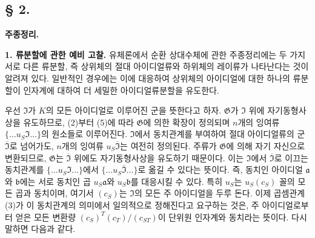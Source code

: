 
\subsection*{§ 2.}
\begin{center}
\textbf{주종정리.}
\end{center}

\noindent\textbf{1. 류분할에 관한 예비 고찰.} 유체론에서 순환 상대수체에 관한 주종정리에는 두 가지 서로 다른 류분할, 즉 상위체의 절대 아이디얼류와 하위체의 레이류가 나타난다는 것이 알려져 있다. 일반적인 경우에는 이에 대응하여 상위체의 아이디얼에 대한 하나의 류분할이 인자계에 대하여 더 세밀한 아이디얼류분할을 유도한다.

우선 \(\mathfrak I\)가 \(K\)의 모든 아이디얼로 이루어진 군을 뜻한다고 하자. \(\mathfrak G\)가 \(\mathfrak I\) 위에 자기동형사상을 유도하므로, (2)부터 (5)에 따라 \(\mathfrak G\)에 의한 확장이 정의되며 \(n\)개의 잉여류 \(\{\ldots u_S\mathfrak I\ldots\}\)의 원소들로 이루어진다. \(\mathfrak I\)에서 동치관계를 부여하여 절대 아이디얼류의 군 \(\overline{\mathfrak I}\)로 넘어가도, \(n\)개의 잉여류 \(u_S\overline{\mathfrak I}\)는 여전히 정의된다. 주류가 \(\mathfrak G\)에 의해 자기 자신으로 변환되므로, \(\mathfrak G\)는 \(\overline{\mathfrak I}\) 위에도 자기동형사상을 유도하기 때문이다. 이는 \(\mathfrak I\)에서 \(\overline{\mathfrak I}\)로 이끄는 동치관계를 \(\{\ldots u_S\mathfrak I\ldots\}\)에서 \(\{\ldots u_S\overline{\mathfrak I}\ldots\}\)로 옮길 수 있다는 뜻이다. 즉, 동치인 아이디얼 \(\mathfrak a\)와 \(\mathfrak b\)에는 서로 동치인 곱 \(u_S\mathfrak a\)와 \(u_S\mathfrak b\)를 대응시킬 수 있다. 특히 \(u_S\)는 \(u_S(c_S)\) 꼴의 모든 곱과 동치이며, 여기서 \((c_S)\)는 \(\mathfrak I\)의 모든 주 아이디얼을 두루 돈다. 이제 곱셈관계 (3)가 이 동치관계의 의미에서 일의적으로 정해진다고 요구하는 것은, 주 아이디얼로부터 얻은 모든 변환량 \((c_S)^T(c_T)/(c_{ST})\)이 단위원 인자계와 동치라는 뜻이다. 다시 말하면 다음과 같다.

